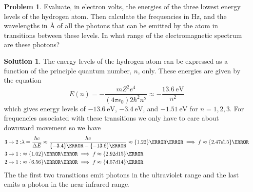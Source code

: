 \documentclass[10pt]{article}
\theoremstyle{definition}
\newtheorem{problem}{Problem}
\newtheorem{soln}{Solution}
\begin{document}
\begin{problem}
Evaluate, in electron volts, the energies of the three lowest energy levels of the hydrogen atom. Then
calculate the frequencies in $\unit{\hertz}$, and the wavelengths in $\unit{\angstrom}$ of all the photons that can be emitted by the
atom in transitions between these levels. In what range of the electromagnetic spectrum are these photons?
\end{problem}
\begin{soln}
  The energy levels of the hydrogen atom can be expressed as a function of the principle quantum number, $n$, only. These
  energies are given by the equation
  $$E(n)=-\frac{mZ^2e^4}{\left(4\pi\epsilon_0\right)2\hbar^2n^2}\approx-\frac{\qty{13.6}{\electronvolt}}{n^2}$$
  which gives energy levels of $\qty{-13.6}{\electronvolt}$, $\qty{-3.4}{\electronvolt}$, and $\qty{-1.51}{\electronvolt}$
  for $n=1,2,3$. For frequencies associated with these transitions we only have to care about downward movement so we have
  \begin{align*}
    3\to 2  : & \lambda=\frac{hc}{\Delta E}\approx\frac{hc}{\qty{-3.4}{\electronvolt}-\qty{-13.6}{\electronvolt}}\approx\qty{1.22}{\kilo\angstrom}
    \implies f\approx\qty{2.47d15}{\hertz}                                                                                                         \\
    3\to 1  : & \approx\qty{1.02}{\kilo\angstrom}\implies f\approx\qty{2.92d15}{\hertz}                                                            \\
    2\to 1  : & \approx\qty{6.56}{\kilo\angstrom}\implies f\approx\qty{4.57d14}{\hertz}
  \end{align*}
  The the first two transitions emit photons in the ultraviolet range and the last emits a photon in the near infrared range.
\end{soln}
\end{document}
